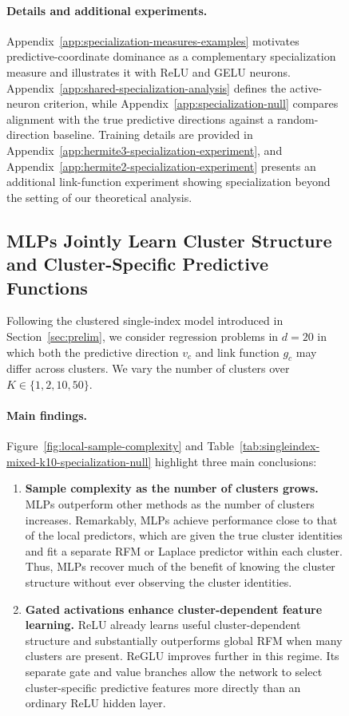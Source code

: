 \documentclass{article}
\newcounter{setting}[section]
\newcounter{model}[section]
\begin{document}
\begin{figure}
\paragraph{Details and additional experiments.}
Appendix~\ref{app:specialization-measures-examples} motivates
predictive-coordinate dominance as a complementary specialization measure
and illustrates it with ReLU and GELU neurons.
Appendix~\ref{app:shared-specialization-analysis} defines the active-neuron
criterion, while Appendix~\ref{app:specialization-null} compares alignment
with the true predictive directions against a random-direction baseline.
Training details are provided in
Appendix~\ref{app:hermite3-specialization-experiment}, and
Appendix~\ref{app:hermite2-specialization-experiment} presents an additional
link-function experiment showing specialization beyond the setting of our
theoretical analysis.




\subsection{MLPs Jointly Learn Cluster Structure and Cluster-Specific Predictive Functions}
\label{sec:local-routing}

Following the clustered single-index model introduced in
Section~\ref{sec:prelim}, we consider regression problems in
\(d=20\) in which both the predictive direction \(v_c\) and link function
\(g_c\) may differ across clusters. We vary the number of clusters over
\(K\in\{1,2,10,50\}\).

\paragraph{Main findings.}
Figure~\ref{fig:local-sample-complexity} and
Table~\ref{tab:singleindex-mixed-k10-specialization-null} highlight three main
conclusions:
\begin{enumerate}
    \item \textbf{Sample complexity as the number of clusters grows.}
    MLPs outperform other methods as the number of clusters increases.
    Remarkably, MLPs achieve performance close to that of the local predictors,
    which are given the true cluster identities and fit a separate RFM or
    Laplace predictor within each cluster. Thus, MLPs recover much of the
    benefit of knowing the cluster structure without ever observing the
    cluster identities.

    \item \textbf{Gated activations enhance cluster-dependent feature learning.}
    ReLU already learns useful cluster-dependent structure and substantially
    outperforms global RFM when many clusters are present. ReGLU improves
    further in this regime. Its separate gate and value branches allow the
    network to select cluster-specific predictive features more directly than
    an ordinary ReLU hidden layer.


\end{enumerate}
\end{figure}
\end{document}
